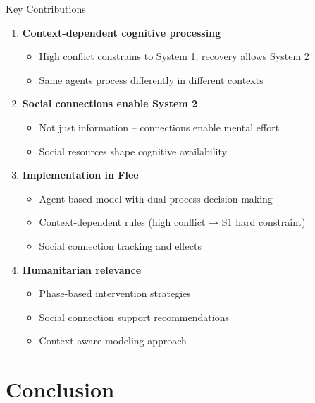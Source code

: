 \documentclass[aspectratio=169]{beamer}
\begin{document}
\begin{frame}{Key Contributions}

\begin{enumerate}
    \item \textbf{Context-dependent cognitive processing}
    \begin{itemize}
        \item High conflict constrains to System 1; recovery allows System 2
        \item Same agents process differently in different contexts
    \end{itemize}
    
    \item \textbf{Social connections enable System 2}
    \begin{itemize}
        \item Not just information – connections enable mental effort
        \item Social resources shape cognitive availability
    \end{itemize}
    
    \item \textbf{Implementation in Flee}
    \begin{itemize}
        \item Agent-based model with dual-process decision-making
        \item Context-dependent rules (high conflict → S1 hard constraint)
        \item Social connection tracking and effects
    \end{itemize}
    
    \item \textbf{Humanitarian relevance}
    \begin{itemize}
        \item Phase-based intervention strategies
        \item Social connection support recommendations
        \item Context-aware modeling approach
    \end{itemize}
\end{enumerate}

\end{frame}

\section{Conclusion}
\end{document}

